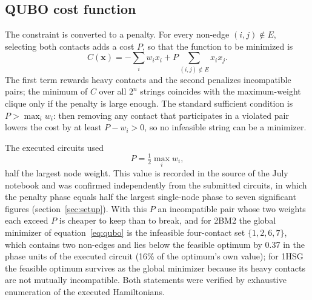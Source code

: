 \documentclass{iopjournal}
\begin{document}
\subsection{QUBO cost function}
\label{sec:qubo}
The constraint is converted to a penalty. For every non-edge $(i,j) \notin E$, selecting both contacts adds a cost $P$, so that the function to be minimized is
\begin{equation}
\label{eq:qubo}
C(\mathbf{x}) = -\sum_{i} w_i x_i + P \sum_{(i,j) \notin E} x_i x_j .
\end{equation}
The first term rewards heavy contacts and the second penalizes incompatible pairs; the minimum of $C$ over all $2^n$ strings coincides with the maximum-weight clique only if the penalty is large enough. The standard sufficient condition is $P > \max_i w_i$: then removing any contact that participates in a violated pair lowers the cost by at least $P - w_i > 0$, so no infeasible string can be a minimizer.

The executed circuits used
\begin{equation}
\label{eq:penalty}
P = \tfrac{1}{2}\max_i w_i ,
\end{equation}
half the largest node weight. This value is recorded in the source of the July notebook and was confirmed independently from the submitted circuits, in which the penalty phase equals half the largest single-node phase to seven significant figures (section~\ref{sec:setup}). With this $P$ an incompatible pair whose two weights each exceed $P$ is cheaper to keep than to break, and for 2BM2 the global minimizer of equation~\eqref{eq:qubo} is the infeasible four-contact set $\{1,2,6,7\}$, which contains two non-edges and lies below the feasible optimum by 0.37 in the phase units of the executed circuit (16\% of the optimum's own value); for 1HSG the feasible optimum survives as the global minimizer because its heavy contacts are not mutually incompatible. Both statements were verified by exhaustive enumeration of the executed Hamiltonians.
\end{document}
